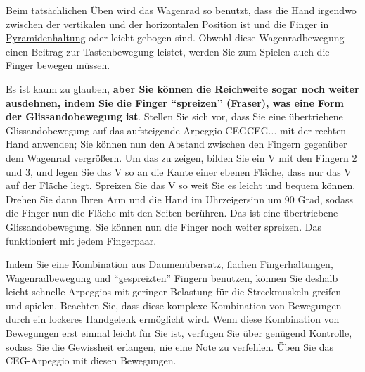 Beim tatsächlichen Üben wird das Wagenrad so benutzt, dass die Hand irgendwo zwischen der vertikalen und der horizontalen Position ist und die Finger in \hyperref[c1iii4b]{Pyramidenhaltung} oder leicht gebogen sind.
Obwohl diese Wagenradbewegung einen Beitrag zur Tastenbewegung leistet, werden Sie zum Spielen auch die Finger bewegen müssen.

Es ist kaum zu glauben, \textbf{aber Sie können die Reichweite sogar noch weiter ausdehnen, indem Sie die Finger \enquote{spreizen} (Fraser), was eine Form der Glissandobewegung ist}.
Stellen Sie sich vor, dass Sie eine übertriebene Glissandobewegung auf das aufsteigende Arpeggio CEGCEG... mit der rechten Hand anwenden;
Sie können nun den Abstand zwischen den Fingern gegenüber dem Wagenrad vergrößern.
Um das zu zeigen, bilden Sie ein V mit den Fingern 2 und 3, und legen Sie das V so an die Kante einer ebenen Fläche, dass nur das V auf der Fläche liegt.
Spreizen Sie das V so weit Sie es leicht und bequem können.
Drehen Sie dann Ihren Arm und die Hand im Uhrzeigersinn um 90 Grad, sodass die Finger nun die Fläche mit den Seiten berühren.
Das ist eine übertriebene Glissandobewegung.
Sie können nun die Finger noch weiter spreizen.
Das funktioniert mit jedem Fingerpaar.

Indem Sie eine Kombination aus \hyperref[c1iii5a]{Daumenübersatz}, \hyperref[c1iii4b]{flachen Fingerhaltungen}, Wagenradbewegung und \enquote{gespreizten} Fingern benutzen, können Sie deshalb leicht schnelle Arpeggios mit geringer Belastung für die Streckmuskeln greifen und spielen.
Beachten Sie, dass diese komplexe Kombination von Bewegungen durch ein lockeres Handgelenk ermöglicht wird.
Wenn diese Kombination von Bewegungen erst einmal leicht für Sie ist, verfügen Sie über genügend Kontrolle, sodass Sie die Gewissheit erlangen, nie eine Note zu verfehlen.
Üben Sie das CEG-Arpeggio mit diesen Bewegungen.

